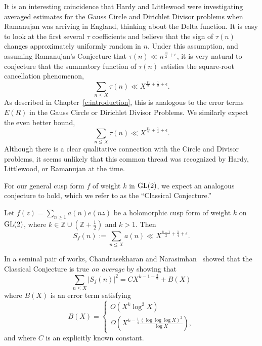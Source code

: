 It is an interesting coincidence that Hardy and Littlewood were investigating averaged
estimates for the Gauss Circle and Dirichlet Divisor problems when Ramanujan was arriving
in England, thinking about the Delta function.
It is easy to look at the first several $\tau$ coefficients and believe that the sign of
$\tau(n)$ changes approximately uniformly random in $n$.
Under this assumption, and assuming Ramanujan's Conjecture that $\tau(n) \ll
n^{\frac{11}{2} + \epsilon}$, it is very natural to conjecture that the summatory function
of $\tau(n)$ satisfies the square-root cancellation phenomenon,
\begin{equation}
  \sum_{n \leq X} \tau(n) \ll X^{\frac{11}{2} + \frac{1}{2} + \epsilon}.
\end{equation}
As described in Chapter~\ref{c:introduction}, this is analogous to the error terms $E(R)$
in the Gauss Circle or Dirichlet Divisor Problems.
We similarly expect the even better bound,
\begin{equation}
  \sum_{n \leq X} \tau(n) \ll X^{\frac{11}{2} + \frac{1}{4} + \epsilon}.
\end{equation}
Although there is a clear qualitative connection with the Circle and Divisor problems, it
seems unlikely that this common thread was recognized by Hardy, Littlewood, or Ramanujan
at the time.


For our general cusp form $f$ of weight $k$ in $\operatorname{GL}(2)$, we expect an analogous conjecture
to hold, which we refer to as the ``Classical Conjecture.''


\begin{conjecture}
  Let $f(z) = \sum_{n \geq 1} a(n) e(nz)$ be a holomorphic cusp form of weight $k$ on
  $\operatorname{GL}(2)$, where $k \in \mathbb{Z}\cup(\mathbb{Z}+\frac{1}{2})$ and $k > 1$.
  Then
  \begin{equation}
    S_f(n) := \sum_{n \leq X} a(n) \ll X^{\frac{k-1}{2} + \frac{1}{4} + \epsilon}.
  \end{equation}
\end{conjecture}


In a seminal pair of works, Chandrasekharan and
Narasimhan~\cite{chandrasekharan1962functional, chandrasekharan1964mean} showed that the
Classical Conjecture is true \emph{on average} by showing that
\begin{equation*}
  \sum_{n \leq X} \lvert S_f(n) \rvert^2 = C X^{k-1 + \frac{3}{2}} + B(X)
\end{equation*}
where $B(X)$ is an error term satisfying
\begin{equation}
  B(X) = \begin{cases}
    O(X^k \log^2 X) \\
    \Omega(X^{k - \frac{1}{4}} \frac{(\log \log \log X)^2}{\log X}),
  \end{cases}
\end{equation}
and where $C$ is an explicitly known constant.


